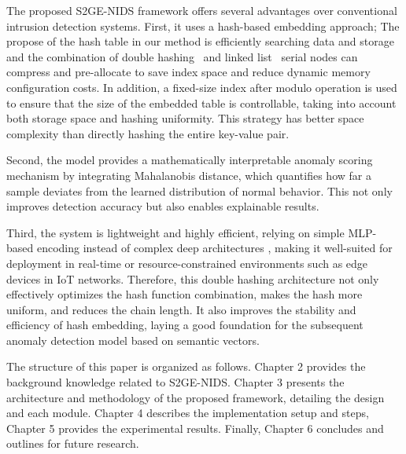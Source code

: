 \begin{ZhChapter}
    The proposed S2GE-NIDS framework offers several advantages over conventional intrusion detection systems. First, it uses a hash-based embedding approach; The propose of the hash table in our method is efficiently searching data and storage and the combination of double hashing~\cite{guibas1976analysis} and linked list~\cite{dietz1982maintaining} serial nodes can compress and pre-allocate to save index space and reduce dynamic memory configuration costs. In addition, a fixed-size index after modulo operation is used to ensure that the size of the embedded table is controllable, taking into account both storage space and hashing uniformity. This strategy has better space complexity than directly hashing the entire key-value pair.

    Second, the model provides a mathematically interpretable anomaly scoring mechanism by integrating Mahalanobis distance, which quantifies how far a sample deviates from the learned distribution of normal behavior. This not only improves detection accuracy but also enables explainable results.

    Third, the system is lightweight and highly efficient, relying on simple MLP-based encoding instead of complex deep architectures \cite{naveed2023comprehensive}, making it well-suited for deployment in real-time or resource-constrained environments such as edge devices in IoT networks. Therefore, this double hashing architecture not only effectively optimizes the hash function combination, makes the hash more uniform, and reduces the chain length. It also improves the stability and efficiency of hash embedding, laying a good foundation for the subsequent anomaly detection model based on semantic vectors.


    The structure of this paper is organized as follows. Chapter 2 provides the background knowledge related to S2GE-NIDS. Chapter 3 presents the architecture and methodology of the proposed framework, detailing the design and each module. Chapter 4 describes the implementation setup and steps, Chapter 5 provides the experimental results. Finally, Chapter 6 concludes and outlines for future research.



\end{ZhChapter}